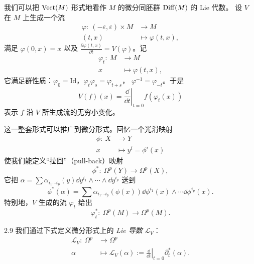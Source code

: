 
我们可以把 $\operatorname{Vect}(M)$ 形式地看作 $M$ 的微分同胚群 $\operatorname{Diff}(M)$ 的 Lie 代数。
设 $V$ 在 $M$ 上生成一个流
\[
  \begin{aligned}
    \varphi:\ (-\varepsilon,\varepsilon)\times M&\longrightarrow M\\
    (t,x)&\longmapsto\varphi(t,x),
  \end{aligned}
\]
满足 $\varphi(0,x)=x$ 以及
$\frac{\partial\varphi(t,x)}{\partial t}=V(\varphi)$。记
\[
  \begin{aligned}
    \varphi_{t}:\ M&\longrightarrow M\\
    x&\longmapsto\varphi(t,x),
  \end{aligned}
\]
它满足群性质：$\varphi_{0}=\mathrm{Id}$，$\varphi_{t}\varphi_{s}=\varphi_{t+s}$，
$\varphi^{-1}=\varphi_{-t}$。于是
\[
  V(f)(x)=\left.\frac{\dd}{\dd t}\right|_{t=0}f(\varphi_{t}(x))
\]
表示 $f$ 沿 $V$ 所生成流的无穷小变化。


这一整套形式可以推广到微分形式。回忆一个光滑映射
\[
  \begin{aligned}
    \phi:\ X&\longrightarrow Y\\
    x&\longmapsto y^{i}=\phi^{i}(x)
  \end{aligned}
\]
使我们能定义“拉回”（pull-back）映射
\[
  \phi^{*}:\ \Omega^{p}(Y)\longrightarrow\Omega^{p}(X),
\]
它把 $\alpha=\sum\alpha_{i_{1}\cdots i_{p}}(y)\dd y^{i_{1}}\wedge\cdots
\wedge\dd y^{i_{p}}$ 送到
\[
  \phi^{*}(\alpha)=\sum\alpha_{i_{1}\cdots i_{p}}(\phi(x))
  \dd\phi^{i_{1}}(x)\wedge\cdots\dd\phi^{i_{p}}(x).
\]
特别地，$V$ 生成的流 $\varphi_{t}$ 给出
\[
  \varphi_{t}^{*}:\ \Omega^{p}(M)\to\Omega^{p}(M).
\]

\begin{wdefn}{2.9}
  我们通过下式定义微分形式上的 \emph{Lie 导数} $\mathcal{L}_{V}$：
  \[
    \begin{aligned}
      \mathcal{L}_{V}:\ \Omega^{p}&\to\Omega^{p}\\
      \alpha&\mapsto\mathcal{L}_{V}(\alpha):=
      \left.\frac{\dd}{\dd t}\right|_{t=0}\partial_{t}^{*}(\alpha).
    \end{aligned}
  \]
\end{wdefn}

